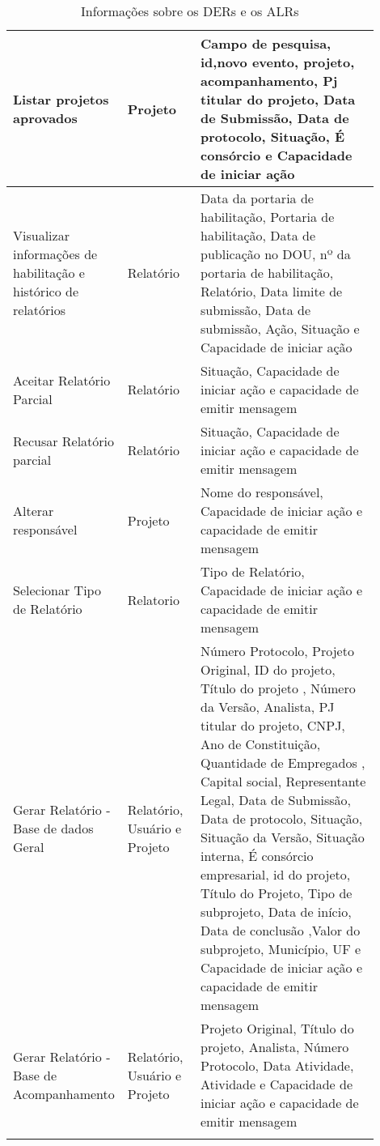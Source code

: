 \begin{longtable}{p{0.20\linewidth}p{0.20\linewidth}p{0.50\linewidth}}
	    \hline
	    Listar projetos aprovados&	Projeto& Campo de pesquisa, id,novo evento,  projeto, acompanhamento, Pj titular do projeto, Data de Submissão, Data de protocolo, Situação, É consórcio e Capacidade de iniciar ação\\
	    \hline
	    Visualizar informações de habilitação e histórico de relatórios&	Relatório& Data da portaria de habilitação, Portaria de habilitação, Data de publicação no DOU, nº da portaria de habilitação, Relatório,
	    Data limite de submissão, Data de submissão, Ação, Situação e Capacidade de iniciar ação\\
	    \hline
	    Aceitar Relatório Parcial&	Relatório& Situação, Capacidade de iniciar ação e capacidade de emitir mensagem\\

	    \hline
	    Recusar Relatório parcial&	Relatório& Situação, Capacidade de iniciar ação e capacidade de emitir mensagem\\
	    
	    \hline
	    Alterar responsável& Projeto& Nome do responsável, Capacidade de iniciar ação e capacidade de emitir mensagem\\
	    
	    \hline
	    Selecionar Tipo de Relatório& Relatorio& Tipo de Relatório, Capacidade de iniciar ação e capacidade de emitir mensagem\\
	    
	    \hline
	    Gerar Relatório - Base de dados Geral& Relatório, Usuário e Projeto& Número Protocolo, Projeto Original, ID do projeto, Título do projeto
	    , Número da Versão, Analista, PJ titular do projeto, CNPJ, Ano de Constituição, Quantidade de Empregados
	    , Capital social, Representante Legal, Data de Submissão, Data de protocolo, Situação, Situação da Versão, Situação
	    interna, É consórcio empresarial, id do projeto, Título do Projeto, Tipo de subprojeto, Data de início, Data de conclusão
	    ,Valor do subprojeto, Município, UF e Capacidade de iniciar ação e capacidade de emitir mensagem\\
	    
	    \hline
	    Gerar Relatório - Base de Acompanhamento& Relatório, Usuário e Projeto& Projeto Original, Título do projeto, Analista, Número Protocolo,
	    Data Atividade, Atividade e Capacidade de iniciar ação e capacidade de emitir mensagem\\
	    
	    \hline
	\caption{Informações sobre os DERs e os ALRs}
	\end{longtable}

